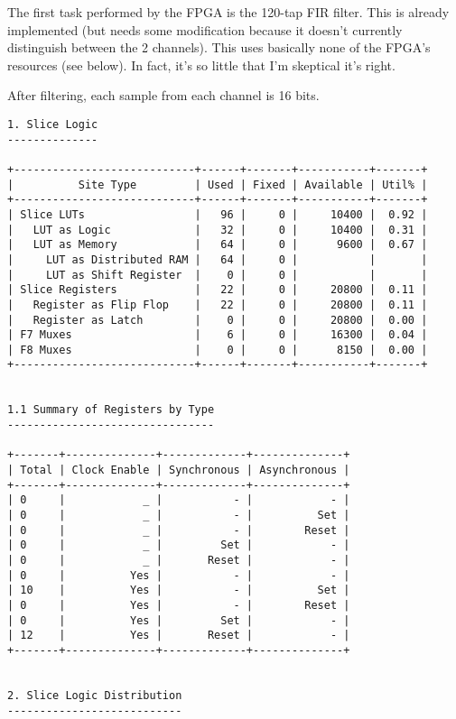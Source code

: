 The first task performed by the FPGA is the 120-tap FIR filter. This is already implemented (but
needs some modification because it doesn't currently distinguish between the 2 channels). This uses
basically none of the FPGA's resources (see below). In fact, it's so little that I'm skeptical it's
right.

After filtering, each sample from each channel is 16 bits.

\begin{verbatim}
1. Slice Logic
--------------

+----------------------------+------+-------+-----------+-------+
|          Site Type         | Used | Fixed | Available | Util% |
+----------------------------+------+-------+-----------+-------+
| Slice LUTs                 |   96 |     0 |     10400 |  0.92 |
|   LUT as Logic             |   32 |     0 |     10400 |  0.31 |
|   LUT as Memory            |   64 |     0 |      9600 |  0.67 |
|     LUT as Distributed RAM |   64 |     0 |           |       |
|     LUT as Shift Register  |    0 |     0 |           |       |
| Slice Registers            |   22 |     0 |     20800 |  0.11 |
|   Register as Flip Flop    |   22 |     0 |     20800 |  0.11 |
|   Register as Latch        |    0 |     0 |     20800 |  0.00 |
| F7 Muxes                   |    6 |     0 |     16300 |  0.04 |
| F8 Muxes                   |    0 |     0 |      8150 |  0.00 |
+----------------------------+------+-------+-----------+-------+


1.1 Summary of Registers by Type
--------------------------------

+-------+--------------+-------------+--------------+
| Total | Clock Enable | Synchronous | Asynchronous |
+-------+--------------+-------------+--------------+
| 0     |            _ |           - |            - |
| 0     |            _ |           - |          Set |
| 0     |            _ |           - |        Reset |
| 0     |            _ |         Set |            - |
| 0     |            _ |       Reset |            - |
| 0     |          Yes |           - |            - |
| 10    |          Yes |           - |          Set |
| 0     |          Yes |           - |        Reset |
| 0     |          Yes |         Set |            - |
| 12    |          Yes |       Reset |            - |
+-------+--------------+-------------+--------------+


2. Slice Logic Distribution
---------------------------


\end{verbatim}

